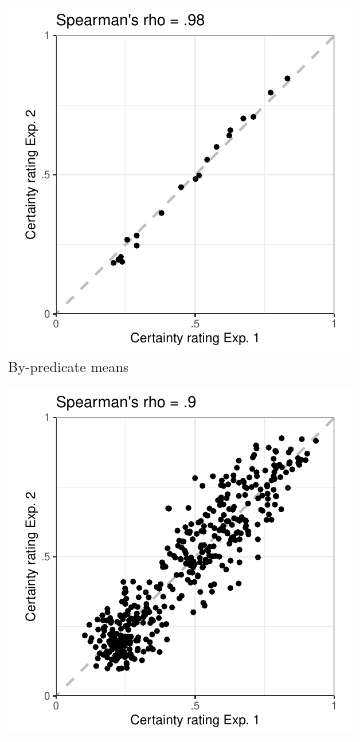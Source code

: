 \documentclass[11pt,fleqn]{article}
\newcommand{\6}{\mbox{$[\hspace*{-.6mm}[$}}
\newcommand{\9}{\mbox{$]\hspace*{-.6mm}]$}}
\begin{document}
\begin{figure}[h!]
\centering
\begin{subfigure}[t]{.3\textwidth}
\centering
\includegraphics[width=\textwidth]{../../results/exp1/graphs/SUP-certainty-Exp1-by-Exp2}
\caption{By-predicate means}
 \end{subfigure}\hfill
\begin{subfigure}[t]{.3\textwidth}
\centering
\includegraphics[width=\textwidth]{../../results/exp1/graphs/SUP-certainty-PredItem-Exp1-by-Exp2}

\end{subfigure}
\end{figure}
\end{document}
